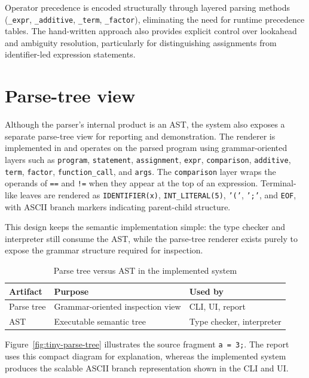 Operator precedence is encoded structurally through layered parsing methods
(\texttt{\_expr}, \texttt{\_additive}, \texttt{\_term}, \texttt{\_factor}),
eliminating the need for runtime precedence tables. The hand-written approach
also provides explicit control over lookahead and ambiguity resolution,
particularly for distinguishing assignments from identifier-led expression
statements.

\section{Parse-tree view}
Although the parser's internal product is an AST, the system also exposes
a separate parse-tree view for reporting and demonstration. The renderer is
implemented in  and operates on the parsed
program using grammar-oriented layers such as \texttt{program},
\texttt{statement}, \texttt{assignment}, \texttt{expr}, \texttt{comparison},
\texttt{additive}, \texttt{term}, \texttt{factor}, \texttt{function\_call}, and
\texttt{args}. The \texttt{comparison} layer wraps the operands of
\texttt{==} and \texttt{!=} when they appear at the top of an expression.
Terminal-like leaves are rendered as \texttt{IDENTIFIER(x)},
\texttt{INT\_LITERAL(5)}, \texttt{'('}, \texttt{';'}, and \texttt{EOF}, with
ASCII branch markers indicating parent-child structure.

This design keeps the semantic implementation simple: the type checker and
interpreter still consume the AST, while the parse-tree renderer exists purely
to expose the grammar structure required for inspection.

\begin{table}[H]
\centering
\caption{Parse tree versus AST in the implemented system}
\label{tab:parse-tree-vs-ast}
\begin{tabular}{lll}
\toprule
\textbf{Artifact} & \textbf{Purpose} & \textbf{Used by} \\
\midrule
Parse tree & Grammar-oriented inspection view & CLI, UI, report \\
AST & Executable semantic tree & Type checker, interpreter \\
\bottomrule
\end{tabular}
\end{table}

Figure~\ref{fig:tiny-parse-tree} illustrates the source fragment
\texttt{a = 3;}. The report uses this compact diagram for explanation, whereas
the implemented system produces the scalable ASCII branch representation shown
in the CLI and UI.

